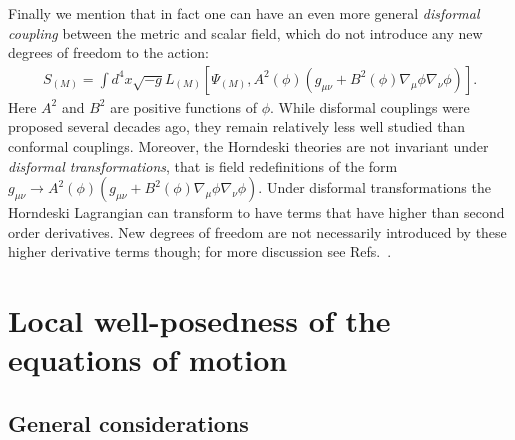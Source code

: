 \documentclass{ws-ijmpd}
\begin{document}
Finally we mention that in fact one can have an even more general
\emph{disformal coupling} between the metric and 
scalar field\cite{Bekenstein:1992pj}, which do not introduce
any new degrees of freedom to the action:
\begin{align}
   S_{(M)}
   =
   \int d^4x\sqrt{-g}L_{(M)}\left[
      \Psi_{(M)},A^2\left(\phi\right)
      \left(
         g_{\mu\nu}
         +
         B^2\left(\phi\right)\nabla_{\mu}\phi\nabla_{\nu}\phi
      \right)
   \right]
   .
\end{align}
Here $A^2$ and $B^2$ are positive functions of $\phi$.
While disformal couplings were proposed several decades 
ago\cite{Bekenstein:1992pj}, they remain relatively less well studied
than conformal couplings.
Moreover, the Horndeski theories are not invariant under \emph{disformal
transformations}, that is field redefinitions of the form 
$g_{\mu\nu}\to
      A^2\left(\phi\right)
      \left(
         g_{\mu\nu}
         +
         B^2\left(\phi\right)\nabla_{\mu}\phi\nabla_{\nu}\phi
      \right)$.
Under disformal transformations the Horndeski Lagrangian can transform
to have terms that have higher than second order derivatives.
New degrees of freedom are not necessarily introduced by these
higher derivative terms though; 
for more discussion see 
Refs.~.
\section{Local well-posedness of the equations of motion
\label{sec:local_well_posedness}
}
\subsection{General considerations\label{sec:general_considerations}}
	
\end{document}
